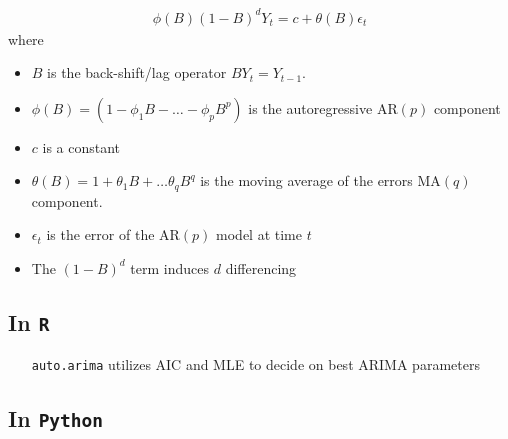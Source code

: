 \documentclass[12pt]{article}
\begin{document}
\begin{align*}
  \phi(B) (1-B)^d Y_t = c + \theta(B) \epsilon_t
\end{align*}
where
\begin{itemize}
\item $B$ is the back-shift/lag operator $BY_t = Y_{t-1}$.
\item $\phi(B) = (1 - \phi_1 B - \ldots - \phi_p B^p )$ is the autoregressive
  $\text{AR}(p)$ component
\item $c$ is a constant
\item $\theta(B) =  1 + \theta_1 B + \ldots \theta_q B^q$ is the moving
    average of the errors $\text{MA}(q)$ component.
\item $\epsilon_t$ is the error of the $\text{AR}(p)$ model at time $t$
\item The $(1-B)^d$ term induces $d$ differencing
\end{itemize}




\subsection{In {\tt R}}

\begin{itemize}
\item[{\tt auto.arima}] utilizes AIC and MLE to decide on best ARIMA parameters
\end{itemize}

\subsection{In {\tt Python}}

\printbibliography[title={References (Time Series \& Forecasting)}]
\pagebreak


\end{document}
